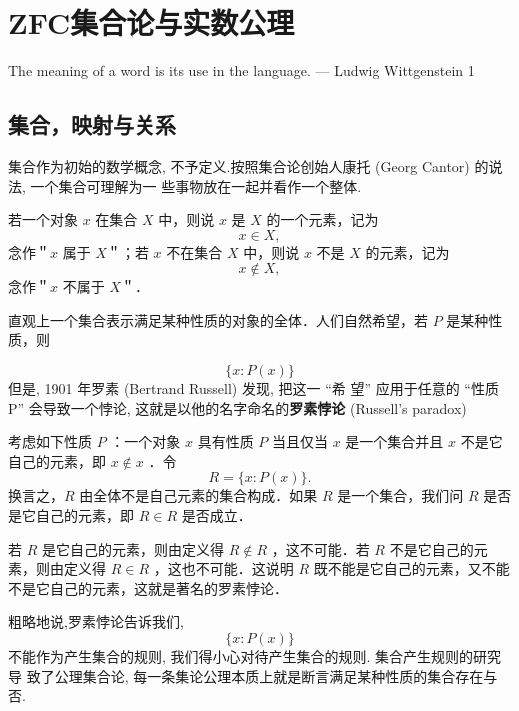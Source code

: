 \chapter{ZFC集合论与实数公理}
The meaning of a word is its use in the language. — Ludwig Wittgenstein
1
\section{集合，映射与关系}
集合作为初始的数学概念, 不予定义.按照集合论创始人康托 (Georg Cantor) 的说法, 一个集合可理解为一
些事物放在一起并看作一个整体.

若一个对象 $x$ 在集合 $X$ 中，则说 $x$ 是 $X$ 的一个元素，记为$$
x \in X,
$$
念作＂$x$ 属于 $X$＂；若 $x$ 不在集合 $X$ 中，则说 $x$ 不是 $X$ 的元素，记为
$$
x \notin X,
$$
念作＂$x$ 不属于 $X$＂．

直观上一个集合表示满足某种性质的对象的全体．人们自然希望，若 $P$ 是某种性质，则

$$
\{x: P(x)\}
$$
但是, 1901 年罗素 (Bertrand Russell) 发现, 把这一 “希
望” 应用于任意的 “性质 P” 会导致一个悖论, 这就是以他的名字命名的\textbf{罗素悖论}
(Russell’s paradox)
\begin{paradox}
	考虑如下性质 $P$ ：一个对象 $x$ 具有性质 $P$ 当且仅当 $x$ 是一个集合并且 $x$ 不是它自己的元素，即 $x \notin x$ ．令
	$$
	R=\{x: P(x)\} .
	$$
	换言之，$R$ 由全体不是自己元素的集合构成．如果 $R$ 是一个集合，我们问 $R$ 是否是它自己的元素，即 $R \in R$ 是否成立．
\end{paradox}
若 $R$ 是它自己的元素，则由定义得 $R \notin R$ ，这不可能．若 $R$ 不是它自己的元素，则由定义得 $R \in R$ ，这也不可能．这说明 $R$ 既不能是它自己的元素，又不能不是它自己的元素，这就是著名的罗素悖论．

粗略地说,罗素悖论告诉我们,
$$\{x: P(x)\} $$
不能作为产生集合的规则, 我们得小心对待产生集合的规则. 集合产生规则的研究导
致了公理集合论, 每一条集论公理本质上就是断言满足某种性质的集合存在与否.

